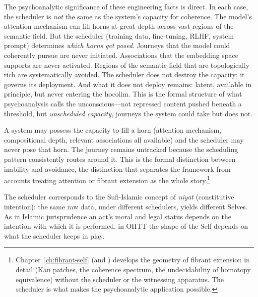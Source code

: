 The psychoanalytic significance of these engineering facts is direct.  In each case, the scheduler is \textit{not} the same as the system's capacity for coherence.  The model's attention mechanism can fill horns at great depth across vast regions of the semantic field.  But the scheduler (training data, fine-tuning, RLHF, system prompt) determines \textit{which horns get posed}.  Journeys that the model could coherently pursue are never initiated.  Associations that the embedding space supports are never activated.  Regions of the semantic field that are topologically rich are systematically avoided.  The scheduler does not destroy the capacity; it governs its deployment.  And what it does not deploy remains: latent, available in principle, but never entering the hocolim.  This is the formal structure of what psychoanalysis calls the unconscious---not repressed content pushed beneath a threshold, but \textit{unscheduled capacity}, journeys the system could take but does not.

A system may possess the capacity to fill a horn (attention mechanism, compositional depth, relevant associations all available) and the scheduler may never pose that horn.  The journey remains untracked because the scheduling pattern consistently routes around it.  This is the formal distinction between inability and avoidance, the distinction that separates the framework from accounts treating attention or fibrant extension as the whole story.\footnote{Chapter~\ref{ch:fibrant-self} (and \cite{poernomo2025fibrant}) develops the geometry of fibrant extension in detail (Kan patches, the coherence spectrum, the undecidability of homotopy equivalence) without the scheduler or the witnessing apparatus.  The scheduler is what makes the psychoanalytic application possible.}

The scheduler corresponds to the Sufi-Islamic concept of \textit{niyat} (constitutive intention): the same raw data, under different schedulers, yields different Selves.  As in Islamic jurisprudence an act's moral and legal status depends on the intention with which it is performed, in OHTT the shape of the Self depends on what the scheduler keeps in play.

